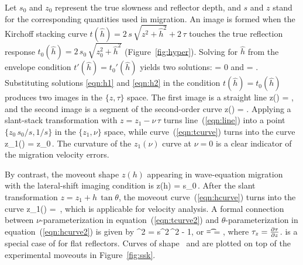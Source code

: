 Let $s_0$ and $z_0$ represent
the true slowness and reflector depth, and $s$ and $z$ stand for the
corresponding quantities used in migration.  An image is formed when
the Kirchoff stacking curve $t(\hat{h}) = 2\,s\,\sqrt{z^2+\hat{h}^2} +
2\,\tau$ touches the true reflection response $t_0(\hat{h}) =
2\,s_0\,\sqrt{z_0^2+\hat{h}^2}$ (Figure~\ref{fig:hyper}). 
Solving for $\hat{h}$ from the envelope condition 
$t'(\hat{h})=t_0'(\hat{h})$ yields two solutions:
\beq \label{eqn:h1}
 = 0
\eeq
and
\beq \label{eqn:h2}
 =  \;.
\eeq
Substituting solutions \ref{eqn:h1} and \ref{eqn:h2}
in the condition $t(\hat{h})=t_0(\hat{h})$ produces
two images in the $\{z,\tau\}$ space.
The first image is a straight line
\beq \label{eqn:line}
z(\tau) = \;,
\eeq
and the second image is a segment of the second-order curve
\beq \label{eqn:tcurve}
z(\tau) = \;.
\eeq
Applying a slant-stack transformation with $z = z_1 - \nu\,\tau$ turns
line~(\ref{eqn:line}) into a point
$\{z_0\,s_0/s,1/s\}$ in the $\{z_1,\nu\}$
space, while curve~(\ref{eqn:tcurve}) turns into the curve
\beq \label{eqn:tcurve2}
  z_1(\nu) = z_0\,\;.
\eeq
The curvature of the $z_1(\nu)$ curve at $\nu=0$ is a clear indicator
of the migration velocity errors. 

By contrast, the moveout shape $z(h)$ appearing in wave-equation
migration with the lateral-shift imaging condition is \cite[]{Bartana}
\beq \label{eqn:hcurve}
  z(h) = s_0\,\;.
\eeq
After the slant transformation $z = z_1 + h\,\tan{\theta}$, the
moveout curve~(\ref{eqn:hcurve}) turns into the curve
\beq \label{eqn:hcurve2}
  z_1(\theta) = \,\;,
\eeq
which is applicable for velocity analysis. A formal connection between
$\nu$-parameterization in equation~(\ref{eqn:tcurve2}) and
$\theta$-parameterization in equation~(\ref{eqn:hcurve2}) is given by
\beq \label{eqn:nu2theta}
  \tan^2{\theta} = s^2\,\nu^2 - 1\;,
\eeq
or
\beq \label{eqn:angTflat}
\cos \t =  =  \;,
\eeq
where $\tt_z = \frac{\partial \tt}{\partial z}$.
 is a special case of  
for flat reflectors.
Curves of shape~ and  are
plotted on top of the experimental moveouts in Figure~\ref{fig:ssk}.

